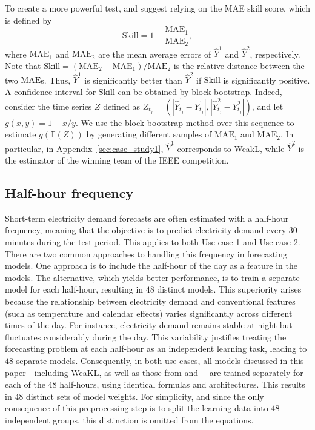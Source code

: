 To create a more powerful test, \citet{Messner2020evaluation} and \citet{Farrokhabadi2022day} suggest relying on the MAE skill score, which is defined by \[\mathrm{Skill}=1-\frac{\mathrm{MAE_{1}}}{\mathrm{MAE_{2}}},\]
where $\mathrm{MAE_{1}}$ and $\mathrm{MAE_{2}}$ are the mean average errors of $\hat{Y}^{1}$ and $\hat{Y}^2$, respectively. 
Note that $\mathrm{Skill}= (\mathrm{MAE}_{2} - 
\mathrm{MAE_{1}})/\mathrm{MAE_{2}}$
is the relative distance between the two $\mathrm{MAE}$s. Thus, $\hat{Y}^{1}$ is significantly better than $\hat{Y}^2$ if $\mathrm{Skill}$ is significantly positive.
A confidence interval for $\mathrm{Skill}$ can be obtained  by block bootstrap.
Indeed, consider the time series $Z$ defined as $Z_{t_j}=(|\hat{Y}^{1}_{t_j}-Y^1_{t_j}|,|\hat{Y}^{2}_{t_j}-Y^2_{t_j}|)$, and let $g(x,y)=1-x/y$. We use the block bootstrap method over this sequence to estimate $g(\mathbb E(Z))$ by generating different samples of $\mathrm{MAE_{1}}$ and $\mathrm{MAE_{2}}$. In particular, in Appendix~\ref{sec:case_study1}, $\hat{Y}^{1}$ corresponds to WeakL, while $\hat{Y}^{2}$ is the estimator of the winning team of the IEEE competition.

\subsection{Half-hour frequency}
\label{sec:half-hour}

Short-term electricity demand forecasts are often estimated with a half-hour frequency, meaning that the objective is to predict electricity demand every $30$ minutes during the test period. This applies to both Use case 1 and Use case 2.
There are two common approaches to handling this frequency in forecasting models. One approach is to include the half-hour of the day as a feature in the models. The alternative, which yields better performance, is to train a separate model for each half-hour, resulting in $48$ distinct models. This superiority arises because the relationship between electricity demand and conventional features (such as temperature and calendar effects) varies significantly across different times of the day. For instance, electricity demand remains stable at night but fluctuates considerably during the day. This variability justifies treating the forecasting problem at each half-hour as an independent learning task, leading to $48$ separate models. Consequently, in both use cases, all models discussed in this paper---including WeaKL, as well as those from \citet{vilmarest2022state} and \citet{doumeche2023human}---are trained separately for each of the $48$ half-hours, using identical formulas and architectures. This results in $48$ distinct sets of model weights. 
For simplicity, and since the only consequence of this preprocessing step is to split the learning data into $48$ independent groups, this distinction is omitted from the equations.

